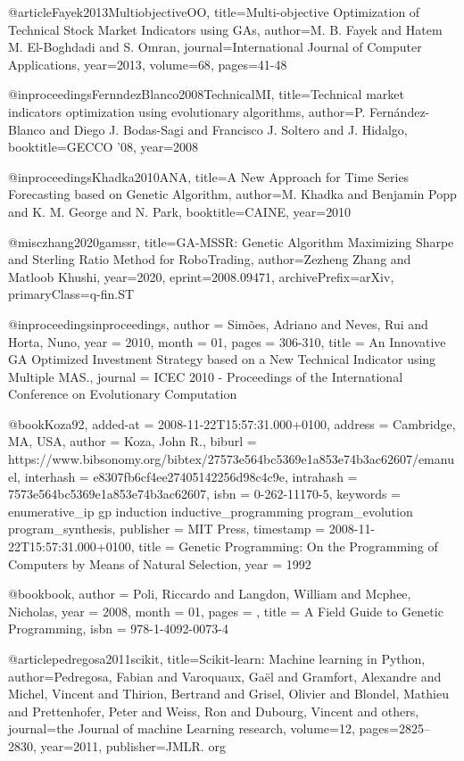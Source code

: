 @article{Fayek2013MultiobjectiveOO,
  title={Multi-objective Optimization of Technical Stock Market Indicators using GAs},
  author={M. B. Fayek and Hatem M. El-Boghdadi and S. Omran},
  journal={International Journal of Computer Applications},
  year={2013},
  volume={68},
  pages={41-48}
}

@inproceedings{FernndezBlanco2008TechnicalMI,
  title={Technical market indicators optimization using evolutionary algorithms},
  author={P. Fern{\'a}ndez-Blanco and Diego J. Bodas-Sagi and Francisco J. Soltero and J. Hidalgo},
  booktitle={GECCO '08},
  year={2008}
}

@inproceedings{Khadka2010ANA,
  title={A New Approach for Time Series Forecasting based on Genetic Algorithm},
  author={M. Khadka and Benjamin Popp and K. M. George and N. Park},
  booktitle={CAINE},
  year={2010}
}

@misc{zhang2020gamssr,
      title={GA-MSSR: Genetic Algorithm Maximizing Sharpe and Sterling Ratio Method for RoboTrading}, 
      author={Zezheng Zhang and Matloob Khushi},
      year={2020},
      eprint={2008.09471},
      archivePrefix={arXiv},
      primaryClass={q-fin.ST}
}

@inproceedings{inproceedings,
author = {Simões, Adriano and Neves, Rui and Horta, Nuno},
year = {2010},
month = {01},
pages = {306-310},
title = {An Innovative GA Optimized Investment Strategy based on a New Technical Indicator using Multiple MAS.},
journal = {ICEC 2010 - Proceedings of the International Conference on Evolutionary Computation}
}

@book{Koza92,
  added-at = {2008-11-22T15:57:31.000+0100},
  address = {Cambridge, MA, USA},
  author = {Koza, John R.},
  biburl = {https://www.bibsonomy.org/bibtex/27573e564bc5369e1a853e74b3ac62607/emanuel},
  interhash = {e8307fb6cf4ee27405142256d98c4c9e},
  intrahash = {7573e564bc5369e1a853e74b3ac62607},
  isbn = {0-262-11170-5},
  keywords = {enumerative_ip gp induction inductive_programming program_evolution program_synthesis},
  publisher = {MIT Press},
  timestamp = {2008-11-22T15:57:31.000+0100},
  title = {Genetic Programming: {O}n the Programming of Computers by Means of Natural Selection},
  year = 1992
}

@book{book,
author = {Poli, Riccardo and Langdon, William and Mcphee, Nicholas},
year = {2008},
month = {01},
pages = {},
title = {A Field Guide to Genetic Programming},
isbn = {978-1-4092-0073-4}
}

@article{pedregosa2011scikit,
  title={Scikit-learn: Machine learning in Python},
  author={Pedregosa, Fabian and Varoquaux, Ga{\"e}l and Gramfort, Alexandre and Michel, Vincent and Thirion, Bertrand and Grisel, Olivier and Blondel, Mathieu and Prettenhofer, Peter and Weiss, Ron and Dubourg, Vincent and others},
  journal={the Journal of machine Learning research},
  volume={12},
  pages={2825--2830},
  year={2011},
  publisher={JMLR. org}
}
